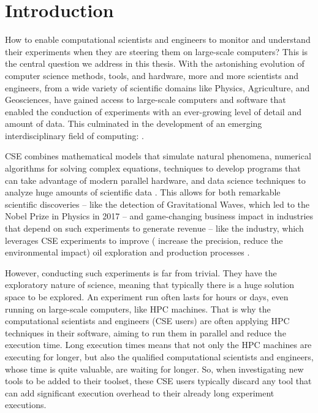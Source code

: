 \chapter{Introduction} \label{chap_intro}

How to enable computational scientists and engineers to monitor and understand their experiments when they are steering them on large-scale computers? 
This is the central question we address in this thesis.
With the astonishing evolution of computer science methods, tools, and hardware, more and more scientists and engineers, from a wide variety of scientific domains like Physics, Agriculture, and Geosciences, have gained access to large-scale computers and software that enabled the conduction of experiments with an ever-growing level of detail and amount of data.
This culminated in the development of an emerging interdisciplinary field of computing:  \cite{Rude2016Research}.


CSE combines mathematical models that simulate natural phenomena, numerical algorithms for solving complex equations,   techniques to develop programs that can take advantage of modern parallel hardware, and data science techniques to analyze huge amounts of scientific data \cite{Rude2016Research}.
This allows for both remarkable scientific discoveries -- like the detection of Gravitational Waves, which led to the Nobel Prize in Physics in 2017 \cite{F.daSilva2016Pegasus} -- and game-changing business impact in industries that depend on such experiments to generate revenue -- like the  industry, which leverages CSE experiments to improve (\eg{} increase the precision, reduce the environmental impact) oil exploration and production processes \cite{ibm_research_editorial_staff_ai_2018}.

However, conducting such experiments is far from trivial. They have the exploratory nature of science, meaning that typically there is a huge solution space to be explored. An experiment run often lasts for hours or days, even running on large-scale computers, like HPC machines. That is why the computational scientists and engineers (CSE users) are often applying HPC techniques in their software, aiming to run them in parallel and reduce the execution time. 
Long execution times means that not only the HPC machines are executing for longer, but also the qualified computational scientists and engineers, whose time is quite valuable, are waiting for longer. So, when investigating new tools to be added to their toolset, these CSE users typically discard any tool that can add significant execution overhead to their already long experiment executions.

